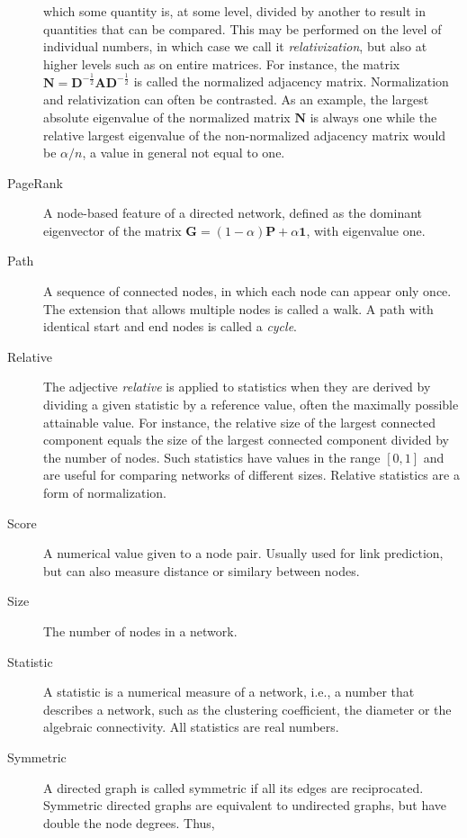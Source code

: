 \documentclass{article}
\begin{document}
\begin{description}
    which some quantity is, at some level, divided by another to result
    in quantities that can be compared.  This may be performed on the
    level of individual numbers, in which case we call it
    \emph{relativization}, but also at higher levels such as on entire
    matrices.  For instance, the matrix $\mathbf N = \mathbf D^{-\frac 1 2}
    \mathbf A \mathbf D^{-\frac 1 2}$ is called the normalized adjacency
    matrix.  Normalization and relativization can often be contrasted.
    As an example, the largest absolute eigenvalue of the normalized
    matrix $\mathbf N$ is always one while the relative largest
    eigenvalue of the non-normalized adjacency matrix would be $\alpha /
    n$, a value in general not equal to one.  
  \item[PageRank] 
    A node-based feature of a directed network, defined as the dominant
    eigenvector of the matrix $\mathbf G = (1-\alpha) \mathbf P +
    \alpha\mathbf 1$, with eigenvalue one. 
  \item[Path]
    A sequence of connected nodes, in which each node can appear only
    once.  The extension that allows multiple nodes is called a walk.  A
    path with identical start and end nodes is called a \emph{cycle}. 
  \item[Relative]
    The adjective \emph{relative} is applied to statistics when they are
    derived by dividing a given statistic by a reference value, often
    the maximally possible attainable value.  For instance, the relative
    size of the largest connected component equals the size of the
    largest connected component divided by the number of nodes.  Such
    statistics have values in the range $[0,1]$ and are useful for
    comparing networks of different sizes.  Relative statistics are a
    form of normalization. 
  \item[Score]
    A numerical value given to a node pair.  Usually used for link
    prediction, but can also measure distance or similary between
    nodes. 
  \item[Size]
    The number of nodes in a network.  
  \item[Statistic]
    A statistic is a numerical measure of a network, i.e., a number that
    describes a network, such as the clustering coefficient, the
    diameter or the algebraic connectivity.  All statistics are real
    numbers.   
  \item[Symmetric] A directed graph is called symmetric if all its edges
    are reciprocated.  Symmetric directed graphs are equivalent to
    undirected graphs, but have double the node degrees.  Thus,

\end{description}
\end{document}
